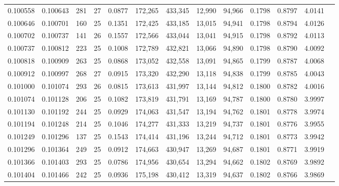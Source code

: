 \begin{tabular}{rrrrrrrrrrrrr}
0.100558 & 0.100643 & 281 &  27 &                                     0.0877 & 172,265 & 433,345 &  12,990 &  94,966 & 0.1798 & 0.8797 & 4.0141 \\
0.100646 & 0.100701 & 160 &  25 &                                     0.1351 & 172,425 & 433,185 &  13,015 &  94,941 & 0.1798 & 0.8794 & 4.0126 \\
0.100702 & 0.100737 & 141 &  26 &                                     0.1557 & 172,566 & 433,044 &  13,041 &  94,915 & 0.1798 & 0.8792 & 4.0113 \\
0.100737 & 0.100812 & 223 &  25 &                                     0.1008 & 172,789 & 432,821 &  13,066 &  94,890 & 0.1798 & 0.8790 & 4.0092 \\
0.100818 & 0.100909 & 263 &  25 &                                     0.0868 & 173,052 & 432,558 &  13,091 &  94,865 & 0.1799 & 0.8787 & 4.0068 \\
0.100912 & 0.100997 & 268 &  27 &                                     0.0915 & 173,320 & 432,290 &  13,118 &  94,838 & 0.1799 & 0.8785 & 4.0043 \\
0.101000 & 0.101074 & 293 &  26 &                                     0.0815 & 173,613 & 431,997 &  13,144 &  94,812 & 0.1800 & 0.8782 & 4.0016 \\
0.101074 & 0.101128 & 206 &  25 &                                     0.1082 & 173,819 & 431,791 &  13,169 &  94,787 & 0.1800 & 0.8780 & 3.9997 \\
0.101130 & 0.101192 & 244 &  25 &                                     0.0929 & 174,063 & 431,547 &  13,194 &  94,762 & 0.1801 & 0.8778 & 3.9974 \\
0.101194 & 0.101248 & 214 &  25 &                                     0.1046 & 174,277 & 431,333 &  13,219 &  94,737 & 0.1801 & 0.8776 & 3.9955 \\
0.101249 & 0.101296 & 137 &  25 &                                     0.1543 & 174,414 & 431,196 &  13,244 &  94,712 & 0.1801 & 0.8773 & 3.9942 \\
0.101296 & 0.101364 & 249 &  25 &                                     0.0912 & 174,663 & 430,947 &  13,269 &  94,687 & 0.1801 & 0.8771 & 3.9919 \\
0.101366 & 0.101403 & 293 &  25 &                                     0.0786 & 174,956 & 430,654 &  13,294 &  94,662 & 0.1802 & 0.8769 & 3.9892 \\
0.101404 & 0.101466 & 242 &  25 &                                     0.0936 & 175,198 & 430,412 &  13,319 &  94,637 & 0.1802 & 0.8766 & 3.9869 \\

\end{tabular}
